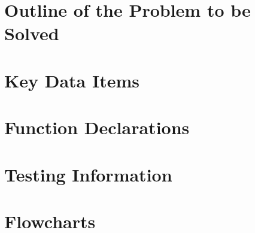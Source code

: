 \documentclass[11pt]{article}
\begin{document}

\pagebreak

\section{Outline of the Problem to be Solved}


\section{Key Data Items}


\section{Function Declarations}


\section{Testing Information}


\section{Flowcharts}


\pagebreak
\end{document}

